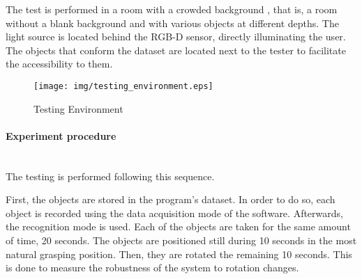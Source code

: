 		The test is performed in a room with a crowded background , that is, a room without a blank background and with various objects at different depths.
		The light source is located behind the RGB-D sensor, directly illuminating the user. 
		The objects that conform the dataset are located next to the tester to facilitate the accessibility to them. 
		\\%

	\begin{figure}[H]
		\begin{center}
	    \texttt{[image: img/testing\_environment.eps]}
		\caption[Testing Environment]{Testing Environment}
		\end{center}
	\end{figure}


	\paragraph{Experiment procedure}\mbox{}\\

		The testing is performed following this sequence. 



		First, the objects are stored in the program's dataset. 
		In order to do so, each object is recorded using the data acquisition mode of the software. 
		Afterwards, the recognition mode is used.
		Each of the objects are taken for the same amount of time, 20 seconds. 
		The objects are positioned still during 10 seconds in the most natural grasping position. 
		Then, they are rotated the remaining 10 seconds. 
		This is done to measure the robustness of the system to rotation changes. 

